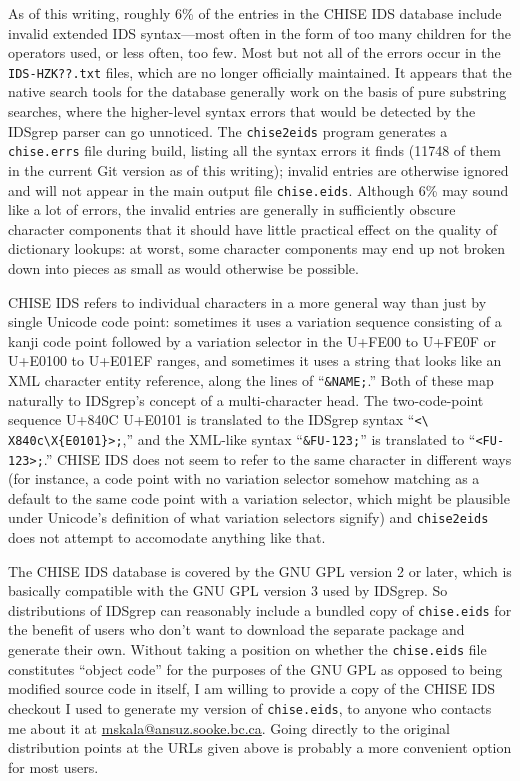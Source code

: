 \documentclass[twocolumn]{report}
\begin{document}
As of this writing, roughly 6\% of the entries in the CHISE IDS database
include invalid extended IDS syntax---most often in the form of too many
children for the operators used, or less often, too few.  Most but not all
of the errors occur in the \texttt{IDS-HZK??.txt} files, which are no longer
officially maintained.  It appears that the native search tools for the
database generally work on the basis of pure substring searches, where the
higher-level syntax errors that would be detected by the IDSgrep parser can
go unnoticed.  The \texttt{chise2eids} program generates a
\texttt{chise.errs} file during build, listing all the syntax errors it
finds (11748 of them in the current Git version as of this writing); invalid
entries are otherwise ignored and will not appear in the main output file
\texttt{chise.eids}.  Although 6\% may sound like a lot of errors, the
invalid entries are generally in sufficiently obscure character components
that it should have little practical effect on the quality of dictionary
lookups: at worst, some character components may end up not broken down into
pieces as small as would otherwise be possible.

CHISE IDS refers to individual characters in a more general way than just by
single Unicode code point: sometimes it uses a variation sequence consisting
of a kanji code point followed by a variation selector in the U+FE00 to
U+FE0F or U+E0100 to U+E01EF ranges, and sometimes it uses a string that
looks like an XML character entity reference, along the lines of
``\texttt{\&NAME;}.'' Both of these map naturally to IDSgrep's concept of a
multi-character head.  The two-code-point sequence U+840C U+E0101 is
translated to the IDSgrep syntax ``\texttt{<\textbackslash%
X840c\textbackslash X\{E0101\}>;},'' and the XML-like syntax
``\texttt{\&FU-123;}'' is translated to ``\texttt{<FU-123>;}.'' CHISE IDS
does not seem to refer to the same character in different ways (for
instance, a code point with no variation selector somehow matching as a
default to the same code point with a variation selector, which might be
plausible under Unicode's definition of what variation selectors signify)
and \texttt{chise2eids} does not attempt to accomodate anything like that.

The CHISE IDS database is covered by the GNU GPL version 2 or later, which
is basically compatible with the GNU GPL version 3 used by IDSgrep.  So
distributions of IDSgrep can reasonably include a bundled copy of
\texttt{chise.eids} for the benefit of users who don't want to download the
separate package and generate their own.  Without taking a position on
whether the \texttt{chise.eids} file constitutes ``object code'' for the
purposes of the GNU GPL as opposed to being modified source code in itself,
I am willing to provide a copy of the CHISE IDS checkout I used to generate
my version of \texttt{chise.eids}, to anyone who contacts me about it at
\url{mskala@ansuz.sooke.bc.ca}.  Going directly to the original distribution
points at the URLs given above is probably a more convenient option for most
users.
\end{document}
